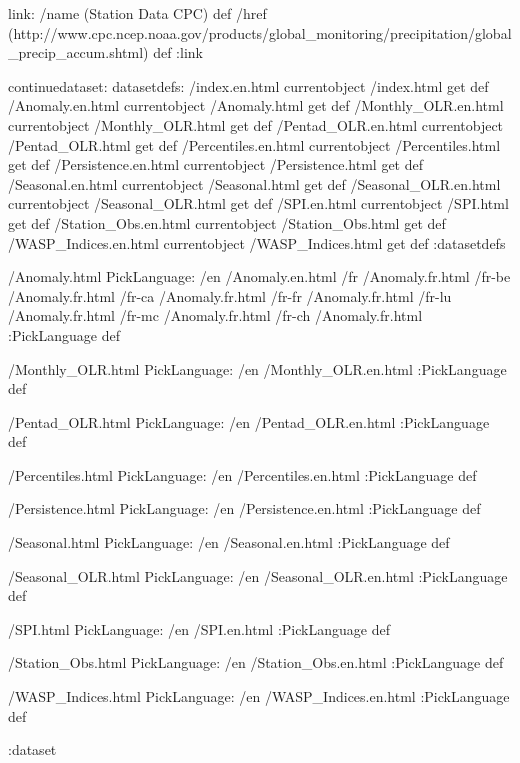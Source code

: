 \begin{ingrid}
link:
/name (Station Data CPC) def
/href (http://www.cpc.ncep.noaa.gov/products/global_monitoring/precipitation/global_precip_accum.shtml) def
:link

continuedataset:
datasetdefs:
/index.en.html currentobject /index.html get def
/Anomaly.en.html currentobject /Anomaly.html get def
/Monthly_OLR.en.html currentobject /Monthly_OLR.html get def
/Pentad_OLR.en.html currentobject /Pentad_OLR.html get def
/Percentiles.en.html currentobject /Percentiles.html get def
/Persistence.en.html currentobject /Persistence.html get def
/Seasonal.en.html currentobject /Seasonal.html get def
/Seasonal_OLR.en.html currentobject /Seasonal_OLR.html get def
/SPI.en.html currentobject /SPI.html get def
/Station_Obs.en.html currentobject /Station_Obs.html get def
/WASP_Indices.en.html currentobject /WASP_Indices.html get def
:datasetdefs

/Anomaly.html {
PickLanguage:
/en /Anomaly.en.html
/fr /Anomaly.fr.html
/fr-be /Anomaly.fr.html
/fr-ca /Anomaly.fr.html
/fr-fr /Anomaly.fr.html
/fr-lu /Anomaly.fr.html
/fr-mc /Anomaly.fr.html
/fr-ch /Anomaly.fr.html
:PickLanguage
} def

/Monthly_OLR.html{
PickLanguage:
/en /Monthly_OLR.en.html
:PickLanguage
} def

/Pentad_OLR.html{
PickLanguage:
/en /Pentad_OLR.en.html
:PickLanguage
} def

/Percentiles.html{
PickLanguage:
/en /Percentiles.en.html
:PickLanguage
} def

/Persistence.html{
PickLanguage:
/en /Persistence.en.html
:PickLanguage
} def


/Seasonal.html{
PickLanguage:
/en /Seasonal.en.html
:PickLanguage
} def


/Seasonal_OLR.html{
PickLanguage:
/en /Seasonal_OLR.en.html
:PickLanguage
} def


/SPI.html{
PickLanguage:
/en /SPI.en.html
:PickLanguage
} def


/Station_Obs.html{
PickLanguage:
/en /Station_Obs.en.html
:PickLanguage
} def


/WASP_Indices.html{
PickLanguage:
/en /WASP_Indices.en.html
:PickLanguage
} def

:dataset
\end{ingrid}
